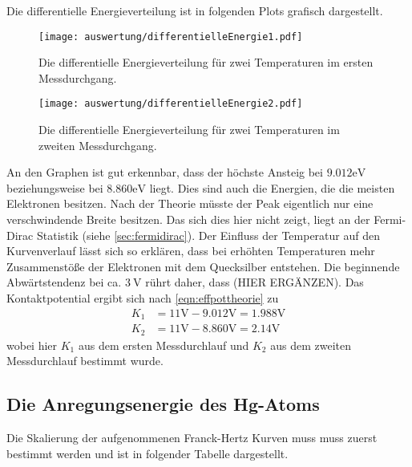 Die differentielle Energieverteilung ist in folgenden Plots grafisch dargestellt.

\begin{figure}[H]
  \centering
  \texttt{[image: auswertung/differentielleEnergie1.pdf]}
  \caption{Die differentielle Energieverteilung für zwei Temperaturen im ersten Messdurchgang.}
  \label{fig:diffenergie1}
\end{figure}

\begin{figure}[H]
  \centering
  \texttt{[image: auswertung/differentielleEnergie2.pdf]}
  \caption{Die differentielle Energieverteilung für zwei Temperaturen im zweiten Messdurchgang.}
  \label{fig:diffenergie2}
\end{figure}
\noindent
An den Graphen ist gut erkennbar, dass der höchste Ansteig bei $9.012\si{\electronvolt}$
beziehungsweise bei $8.860\si{\electronvolt}$ liegt. Dies sind auch die Energien, die die meisten
Elektronen besitzen.
Nach der Theorie müsste der Peak eigentlich nur eine verschwindende Breite besitzen.
Das sich dies hier nicht zeigt, liegt an der Fermi-Dirac Statistik (siehe \ref{sec:fermidirac}).
Der Einfluss der Temperatur auf den Kurvenverlauf lässt sich so erklären, dass bei erhöhten
Temperaturen mehr Zusammenstöße der Elektronen mit dem Quecksilber entstehen.
Die beginnende Abwärtstendenz bei ca. $\SI{3}{\volt}$ rührt daher, dass  (HIER ERGÄNZEN).
\noindent
Das Kontaktpotential ergibt sich nach \eqref{eqn:effpottheorie} zu
\begin{align}
  K_1  & = 11 \si{\volt} -  9.012 \si{\volt} = 1.988 \si{\volt} \\
  K_2  & = 11 \si{\volt} -  8.860 \si{\volt} = 2.14  \si{\volt}
  \label{eqn:kpotausw}
\end{align}
\noindent
wobei hier $K_1$ aus dem ersten Messdurchlauf und $K_2$ aus dem zweiten Messdurchlauf bestimmt wurde.

\subsection{Die Anregungsenergie des Hg-Atoms}
Die Skalierung der aufgenommenen Franck-Hertz Kurven muss muss zuerst bestimmt werden
und ist in folgender Tabelle dargestellt.

